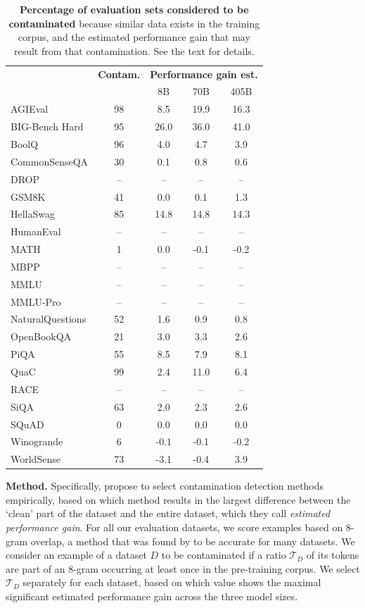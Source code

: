 \documentclass[dvipsnames]{fairmeta}
\begin{document}
\begin{table}
{\begin{tabular}{lcccc}
        \toprule
        & \textbf{Contam.} & \multicolumn{3}{c}{\textbf{Performance gain est.}}\\
        & & 8B & 70B & 405B \\
        \midrule
        AGIEval & 98 & 8.5 & 19.9 & 16.3 \\
        BIG-Bench Hard & 95 & 26.0 & 36.0 & 41.0 \\
        BoolQ & 96 & 4.0 & 4.7 & 3.9 \\
        CommonSenseQA & 30 & 0.1 & 0.8 & 0.6 \\
        DROP & -- & -- & -- & -- \\
        GSM8K & 41 & 0.0 & 0.1 & 1.3 \\
        HellaSwag & 85 & 14.8 & 14.8 & 14.3 \\
        HumanEval & -- & -- & -- & -- \\
        MATH & 1 & 0.0 & -0.1 & -0.2 \\
        MBPP & -- & -- & -- & -- \\
        MMLU & -- & -- & -- & -- \\
        MMLU-Pro & -- & -- & -- & -- \\
        NaturalQuestions & 52 & 1.6 & 0.9 & 0.8 \\
        OpenBookQA & 21 & 3.0 & 3.3 & 2.6 \\
        PiQA & 55 & 8.5 & 7.9 & 8.1 \\
        QuaC & 99 & 2.4 & 11.0 & 6.4 \\
        RACE & -- & -- & -- & -- \\
        SiQA & 63 & 2.0 & 2.3 & 2.6 \\
        SQuAD & 0 & 0.0 & 0.0 & 0.0 \\
        Winogrande & 6 & -0.1 & -0.1 & -0.2 \\
        WorldSense & 73 & -3.1 & -0.4 & 3.9 \\ 
        \bottomrule
    \end{tabular}
    }
    \caption{\textbf{Percentage of evaluation sets considered to be contaminated} because similar data exists in the training corpus, and the estimated performance gain that may result from that contamination. See the text for details. }
    \label{table:contamination}

\end{table}

\textbf{Method.}
Specifically, \citet{singh2024contamination} propose to select contamination detection methods empirically, based on which method results in the largest difference between the `clean' part of the dataset and the entire dataset, which they call \emph{estimated performance gain}.
For all our evaluation datasets, we score examples based on 8-gram overlap, a method that was found by \citet{singh2024contamination} to be accurate for many datasets.
We consider an example of a dataset $D$ to be contaminated if a ratio $\mathcal{T}_D$ of its tokens are part of an 8-gram occurring at least once in the pre-training corpus.
We select $\mathcal{T}_D$ separately for each dataset, based on which value shows the maximal significant estimated performance gain across the three model sizes.
\end{document}
